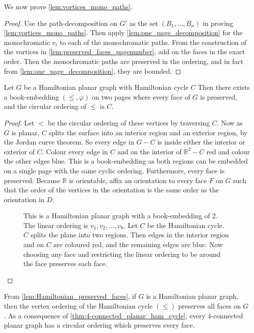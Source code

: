 We now prove \cref{lem:vortices_mono_paths}.
\begin{proof}
	Use the path-decomposition on \(G'\) as the set \((B_1, \ldots , B_n)\) in proving \cref{lem:vortices_mono_paths}. Then apply \cref{lem:one_page_decomposition} for the monochromatic \(v_i\) to each of the monochromatic paths. From the construction of the vortices in \cref{lem:preserved_faces_pagenumber}, add on the faces in the exact order. Then the monochromatic paths are preserved in the ordering, and in fact from \cref{lem:one_page_decomposition}, they are bounded.
\end{proof}
\begin{lemma}\label{lem:Hamiltonian_preserved_faces}
	Let \(G\) be a Hamiltonian planar graph with Hamiltonian cycle $C$ Then there exists a book-embedding $(\leq, \varphi)$ on two pages where every face of $G$ is preserved, and the circular ordering of $\leq$ is $C$.
\end{lemma}

\begin{proof}
	Let \(<\) be the circular ordering of these vertices by traversing \(C\). Now as \(G\) is planar, \(C\) splits the surface into an interior region and an exterior region, by the Jordan curve theorem. So every edge in $G - C$ is inside either the interior or exterior of \(C\). Colour every edge in $C$ and on the interior of $\mathbb{R}^2 - C$ red and colour the other edges blue. This is a book-embedding as both regions can be embedded on a single page with the same cyclic ordering. Furthermore, every face is preserved. Because $\mathbb{R}$ is orientable, affix an orientation to every face \(F\) on $G$ such that the order of the vertices in the orientation is the same order as the orientation in \(D\).
	\begin{figure}[h!]
		\centering
		
		\caption[Hamiltonian planar graph]{This is a Hamiltonian planar graph with a book-embedding of 2. The linear ordering is $v_1, v_2, \ldots,  v_8$. Let $C$ be the Hamiltonian cycle. $C$ splits the plane into two regions. Then edges in the interior region and on $C$ are coloured red, and the remaining edges are blue. Now choosing any face and restricting the linear ordering to be around the face preserves each face. }\label{fig:hamiltonian_planar}
	\end{figure}
\end{proof}
From \cref{lem:Hamiltonian_preserved_faces}, if \(G\) is a Hamiltonian planar graph, then the vertex ordering of the Hamiltonian cycle \((\leq)\) preserves all faces on \(G\). As a consequence of \cref{thm:4-connected_planar_ham_cycle}, every 4-connected planar graph has a circular ordering which preserves every face.


